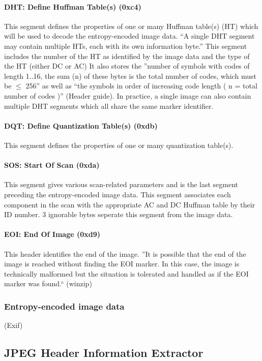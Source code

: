 \paragraph*{DHT: Define Huffman Table(s) (0xc4)}
This segment defines the properties of one or many Huffman table(s) (HT) which will be used to decode the entropy-encoded image data. ``A single DHT segment may contain multiple HTs, each with its own information byte.'' This segment includes the number of the HT as identified by the image data and the type of the HT (either DC or AC) It also stores the ''number of symbols with codes of length 1..16, the sum (n) of these bytes is the total number of codes, which must be $\leq$ 256'' as well as ``the symbols in order of increasing code length ( n = total number of codes )'' (Header guide). In practice, a single image can also contain multiple DHT segments which all share the same marker identifier. 

\paragraph*{DQT: Define Quantization Table(s) (0xdb)}
This segment defines the properties of one or many quantization table(s).

\paragraph*{SOS: Start Of Scan (0xda)}
This segment gives various scan-related parameters and is the last segment preceding the entropy-encoded image data. This segment associates each component in the scan with the appropriate AC and DC Huffman table by their ID number. 3 ignorable bytes seperate this segment from the image data. 

\paragraph*{EOI: End Of Image (0xd9)}
This header identifies the end of the image. ''It is possible that the end of the image is reached without finding the EOI marker. In this case, the image is technically malformed but the situation is tolerated and handled as if the EOI marker was found.`` (winzip) 

\subsubsection{Entropy-encoded image data}
(Exif)

\subsection{JPEG Header Information Extractor}

